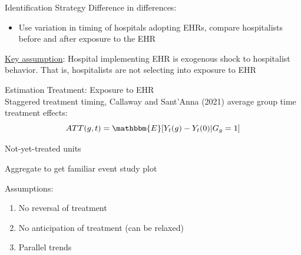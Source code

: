 \documentclass[notes,11pt, aspectratio=169]{beamer}
\newenvironment{wideitemize}{\itemize\addtolength{\itemsep}{10pt}}{\enditemize}
\begin{document}
\begin{frame}{Identification Strategy}
    Difference in differences:
    \begin{itemize}
        \item Use variation in timing of hospitals adopting EHRs, compare hospitalists before and after exposure to the EHR
    \end{itemize}
    
                \vspace{5mm}
                
    \underline{Key assumption}: Hospital implementing EHR is exogenous shock to hospitalist behavior. That is, hospitalists are not selecting into exposure to EHR
\end{frame}


\begin{frame}{Estimation}
Treatment: Exposure to EHR\\
                \vspace{4mm}
Staggered treatment timing, Callaway and Sant'Anna (2021) average group time treatment effects:
$$ATT(g,t)=\mathbbm{E}[Y_t(g)-Y_t(0)|G_g=1]$$

\vspace{-1mm}

\begin{wideitemize}
    \item Not-yet-treated units
    \item Aggregate to get familiar event study plot
\end{wideitemize}

\vspace{3mm}

\pause Assumptions:
\begin{enumerate}
    \item No reversal of treatment
    \item No anticipation of treatment (can be relaxed)
    \item Parallel trends
\end{enumerate} 
\end{frame}
\end{document}
